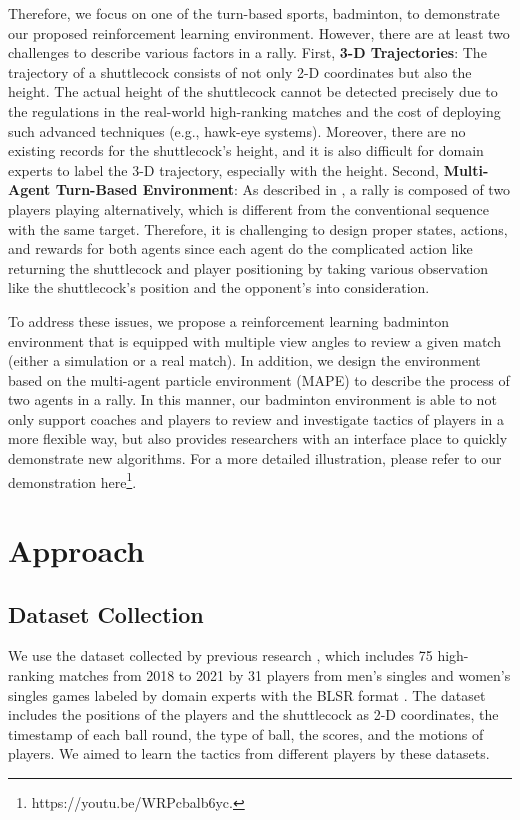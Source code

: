 \documentclass[letterpaper]{article}
\begin{document}
Therefore, we focus on one of the turn-based sports, badminton, to demonstrate our proposed reinforcement learning environment.
However, there are at least two challenges to describe various factors in a rally.
First, \textbf{3-D Trajectories}: The trajectory of a shuttlecock consists of not only 2-D coordinates but also the height.
The actual height of the shuttlecock cannot be detected precisely due to the regulations in the real-world high-ranking matches and the cost of deploying such advanced techniques (e.g., hawk-eye systems).
Moreover, there are no existing records for the shuttlecock's height, and it is also difficult for domain experts to label the 3-D trajectory, especially with the height.
Second, \textbf{Multi-Agent Turn-Based Environment}: As described in \cite{DBLP:conf/aaai/WangSCP22}, a rally is composed of two players playing alternatively, which is different from the conventional sequence with the same target.
Therefore, it is challenging to design proper states, actions, and rewards for both agents since each agent do the complicated action like returning the shuttlecock and player positioning by taking various observation like the shuttlecock's position and the opponent's into consideration.

To address these issues, we propose a reinforcement learning badminton environment that is equipped with multiple view angles to review a given match (either a simulation or a real match).
In addition, we design the environment based on the multi-agent particle environment (MAPE)  \cite{NIPS2017_68a97503} to describe the process of two agents in a rally.
In this manner, our badminton environment is able to not only support coaches and players to review and investigate tactics of players in a more flexible way, but also provides researchers with an interface place to quickly demonstrate new algorithms.
For a more detailed illustration, please refer to our demonstration here\footnote{https://youtu.be/WRPcbalb6yc.}.

\section{Approach}

\subsection{Dataset Collection}
We use the dataset collected by previous research \cite{DBLP:conf/aaai/WangSCP22}, which includes 75 high-ranking matches from 2018 to 2021 by 31 players from men's singles and women's singles games labeled by domain experts with the BLSR format \cite{DBLP:conf/icdm/WangCYWFP21,10.1145/3551391}.
The dataset includes the positions of the players and the shuttlecock as 2-D coordinates, the timestamp of each ball round, the type of ball, the scores, and the motions of players.
We aimed to learn the tactics from different players by these datasets.
\end{document}
